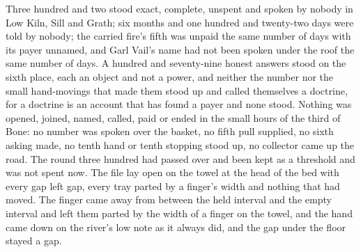 Three hundred and two stood exact, complete, unspent and spoken by nobody in Low Kiln, Sill and Grath; six months and one hundred and twenty-two days were told by nobody; the carried fire's fifth was unpaid the same number of days with its payer unnamed, and Garl Vail's name had not been spoken under the roof the same number of days. A hundred and seventy-nine honest answers stood on the sixth place, each an object and not a power, and neither the number nor the small hand-movings that made them stood up and called themselves a doctrine, for a doctrine is an account that has found a payer and none stood. Nothing was opened, joined, named, called, paid or ended in the small hours of the third of Bone: no number was spoken over the basket, no fifth pull supplied, no sixth asking made, no tenth hand or tenth stopping stood up, no collector came up the road. The round three hundred had passed over and been kept as a threshold and was not spent now. The file lay open on the towel at the head of the bed with every gap left gap, every tray parted by a finger's width and nothing that had moved. The finger came away from between the held interval and the empty interval and left them parted by the width of a finger on the towel, and the hand came down on the river's low note as it always did, and the gap under the floor stayed a gap.

